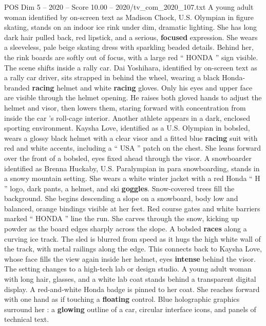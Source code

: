\begin{textsample}{POS Dim 5 – 2020 – Score 10.00 – 2020/tv\_com\_2020\_107.txt}  \label{ex:f5_pos_064}
A young adult woman identified by on-screen text as Madison Chock, U.S.
Olympian in figure skating, stands on an indoor ice rink under dim, dramatic lighting.
She has long dark hair pulled back, red lipstick, and a serious, \textbf{focused} expression.
She wears a sleeveless, pale beige skating dress with sparkling beaded details.
Behind her, the rink boards are softly out of focus, with a large red “ HONDA ” sign visible.
The scene shifts inside a rally car.
Dai Yoshihara, identified by on-screen text as a rally car driver, sits strapped in behind the wheel, wearing a black Honda-branded \textbf{racing} helmet and white \textbf{racing} gloves.
Only his eyes and upper face are visible through the helmet opening.
He raises both gloved hands to adjust the helmet and visor, then lowers them, staring forward with concentration from inside the car ’s roll-cage interior.
Another athlete appears in a dark, enclosed sporting environment.
Kaysha Love, identified as a U.S.
Olympian in bobsled, wears a glossy black helmet with a clear visor and a fitted blue \textbf{racing} suit with red and white accents, including a “ USA ” patch on the chest.
She leans forward over the front of a bobsled, eyes fixed ahead through the visor.
A snowboarder identified as Brenna Huckaby, U.S.
Paralympian in para snowboarding, stands in a snowy mountain setting.
She wears a white winter jacket with a red Honda “ H ” logo, dark pants, a helmet, and ski \textbf{goggles}.
Snow-covered trees fill the background.
She begins descending a slope on a snowboard, body low and balanced, orange bindings visible at her feet.
Red course gates and white barriers marked “ HONDA ” line the run.
She carves through the snow, kicking up powder as the board edges sharply across the slope.
A bobsled \textbf{races} along a curving ice track.
The sled is blurred from speed as it hugs the high white wall of the track, with metal railings along the edge.
This connects back to Kaysha Love, whose face fills the view again inside her helmet, eyes \textbf{intense} behind the visor.
The setting changes to a high-tech lab or design studio.
A young adult woman with long hair, glasses, and a white lab coat stands behind a transparent digital display.
A red-and-white Honda badge is pinned to her coat.
She reaches forward with one hand as if touching a \textbf{floating} control.
Blue holographic graphics surround her : a \textbf{glowing} outline of a car, circular interface icons, and panels of technical text.

\end{textsample}
